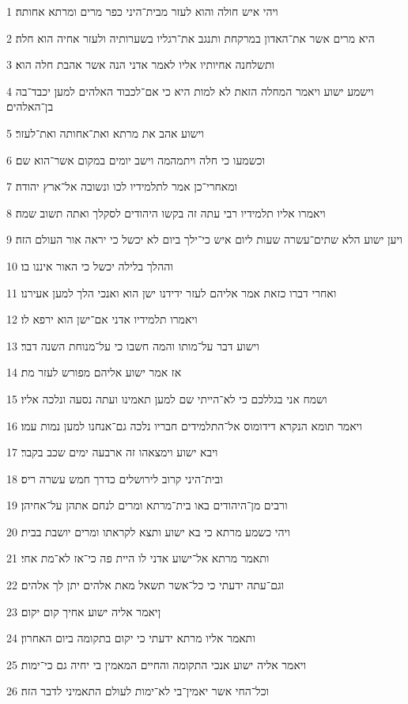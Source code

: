 \par 1 ויהי איש חולה והוא לעזר מבית־היני כפר מרים ומרתא אחותה׃
\par 2 היא מרים אשר את־האדון במרקחת ותנגב את־רגליו בשערותיה ולעזר אחיה הוא חלה׃
\par 3 ותשלחנה אחיותיו אליו לאמר אדני הנה אשר אהבת חלה הוא׃
\par 4 וישמע ישוע ויאמר המחלה הזאת לא למות היא כי אם־לכבוד האלהים למען יכבד־בה בן־האלהים׃
\par 5 וישוע אהב את מרתא ואת־אחותה ואת־לעזר׃
\par 6 וכשמעו כי חלה ויתמהמה וישב יומים במקום אשר־הוא שם׃
\par 7 ומאחרי־כן אמר לתלמידיו לכו ונשובה אל־ארץ יהודה׃
\par 8 ויאמרו אליו תלמידיו רבי עתה זה בקשו היהודים לסקלך ואתה תשוב שמה׃
\par 9 ויען ישוע הלא שתים־עשרה שעות ליום איש כי־ילך ביום לא יכשל כי יראה אור העולם הזה׃
\par 10 וההלך בלילה יכשל כי האור איננו בו׃
\par 11 ואחרי דברו כזאת אמר אליהם לעזר ידידנו ישן הוא ואנכי הלך למען אעירנו׃
\par 12 ויאמרו תלמידיו אדני אם־ישן הוא ירפא לו׃
\par 13 וישוע דבר על־מותו והמה חשבו כי על־מנוחת השנה דבר׃
\par 14 אז אמר ישוע אליהם מפורש לעזר מת׃
\par 15 ושמח אני בגללכם כי לא־הייתי שם למען תאמינו ועתה נסעה ונלכה אליו׃
\par 16 ויאמר תומא הנקרא דידומוס אל־התלמידים חבריו נלכה גם־אנחנו למען נמות עמו׃
\par 17 ויבא ישוע וימצאהו זה ארבעה ימים שכב בקבר׃
\par 18 ובית־היני קרוב לירושלים כדרך חמש עשרה ריס׃
\par 19 ורבים מן־היהודים באו בית־מרתא ומרים לנחם אתהן על־אחיהן׃
\par 20 ויהי כשמע מרתא כי בא ישוע ותצא לקראתו ומרים יושבת בבית׃
\par 21 ותאמר מרתא אל־ישוע אדני לו היית פה כי־אז לא־מת אחי׃
\par 22 וגם־עתה ידעתי כי כל־אשר תשאל מאת אלהים יתן לך אלהים׃
\par 23 ןיאמר אליה ישוע אחיך קום יקום׃
\par 24 ותאמר אליו מרתא ידעתי כי יקום בתקומה ביום האחרון׃
\par 25 ויאמר אליה ישוע אנכי התקומה והחיים המאמין בי יחיה גם כי־ימות׃
\par 26 וכל־החי אשר יאמין־בי לא־ימות לעולם התאמיני לדבר הזה׃
